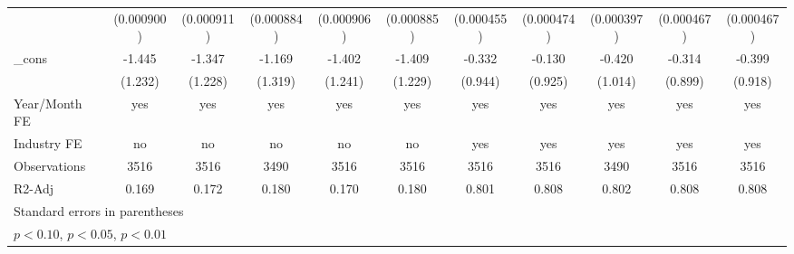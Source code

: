 \begin{table}[htbp]
\begin{tabular}{l*{10}{c}}
                &(0.000900)         &(0.000911)         &(0.000884)         &(0.000906)         &(0.000885)         &(0.000455)         &(0.000474)         &(0.000397)         &(0.000467)         &(0.000467)         \\
\_cons          &   -1.445         &   -1.347         &   -1.169         &   -1.402         &   -1.409         &   -0.332         &   -0.130         &   -0.420         &   -0.314         &   -0.399         \\
                &  (1.232)         &  (1.228)         &  (1.319)         &  (1.241)         &  (1.229)         &  (0.944)         &  (0.925)         &  (1.014)         &  (0.899)         &  (0.918)         \\
\hline
Year/Month FE   &      yes         &      yes         &      yes         &      yes         &      yes         &      yes         &      yes         &      yes         &      yes         &      yes         \\
Industry FE     &       no         &       no         &       no         &       no         &       no         &      yes         &      yes         &      yes         &      yes         &      yes         \\
Observations    &     3516         &     3516         &     3490         &     3516         &     3516         &     3516         &     3516         &     3490         &     3516         &     3516         \\
R2-Adj          &    0.169         &    0.172         &    0.180         &    0.170         &    0.180         &    0.801         &    0.808         &    0.802         &    0.808         &    0.808         \\
\hline\hline
\multicolumn{11}{l}{\footnotesize Standard errors in parentheses}\\
\multicolumn{11}{l}{\footnotesize \sym{*} \(p<0.10\), \sym{**} \(p<0.05\), \sym{***} \(p<0.01\)}\\
\end{tabular}
\end{table}
